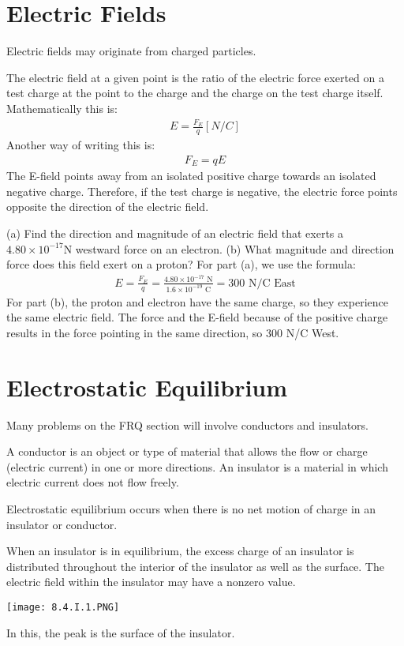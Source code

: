 \documentclass[../em.tex]{subfiles}
\begin{document}
\section{Electric Fields}
Electric fields may originate from charged particles.

The electric field at a given point is the ratio of the electric force exerted on a test charge at the point to the charge and the charge on the test charge itself.
Mathematically this is:
\begin{align*}
E = \frac{F_E}{q}[N/C]
\end{align*}
Another way of writing this is:
\begin{align*}
F_E=qE
\end{align*}
The E-field points away from an isolated positive charge towards an isolated negative charge. Therefore, if the test charge is negative, the electric force points opposite the direction of the electric field.
\begin{example}
(a) Find the direction and magnitude of an electric field that exerts a $4.80\times10^{-17}$N westward force on an electron. 
\smallbreak
(b) What magnitude and direction force does this field exert on a proton?
\smallbreak
For part (a), we use the formula:
    \begin{align*}
    E=\frac{F_E}{q}=\frac{4.80\times10^{-17}\text{ N}}{1.6\times10^{-19}\text{ C}}=300  \text{ N/C East}
    \end{align*}
For part (b), the proton and electron have the same charge, so they experience the same electric field. The force and the E-field because of the positive charge results in the force pointing in the same direction, so 300 N/C West.
\end{example}
\section{Electrostatic Equilibrium}
Many problems on the FRQ section will involve conductors and insulators. 

A conductor is an object or type of material that allows the flow or charge (electric current) in one or more directions. An insulator is a material in which electric current does not flow freely.

Electrostatic equilibrium occurs when there is no net motion of charge in an insulator or conductor.

When an insulator is in equilibrium, the excess charge of an insulator is distributed throughout the interior of the insulator as well as the surface. The electric field within the insulator may have a nonzero value. 
\begin{center}
    \texttt{[image: 8.4.I.1.PNG]}
\end{center}
In this, the peak is the surface of the insulator. 
\end{document}
